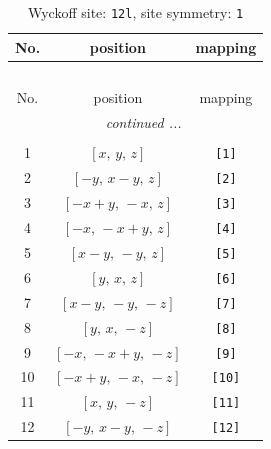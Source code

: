 \documentclass[fleqn,8pt]{jsarticle}
\begin{document}
\begin{longtable}{ccc}
\caption{Wyckoff site: {\tt 12l}, site symmetry: {\tt 1}}
 \\
 \hline \hline
No. & position & mapping \\ \hline \endfirsthead

\multicolumn{2}{l}{\tablename\ \thetable{}} \\
 \hline \hline
No. & position & mapping \\ \hline \endhead

 \hline \hline
\multicolumn{2}{r}{\footnotesize\it continued ...} \\ \endfoot

 \hline \hline
\multicolumn{2}{r}{} \\ \endlastfoot

1 & $\left[ x,\, y,\, z \right]$ & {\tt [1]} \\ \hline
2 & $\left[ - y,\, x - y,\, z \right]$ & {\tt [2]} \\ \hline
3 & $\left[ - x + y,\, - x,\, z \right]$ & {\tt [3]} \\ \hline
4 & $\left[ - x,\, - x + y,\, z \right]$ & {\tt [4]} \\ \hline
5 & $\left[ x - y,\, - y,\, z \right]$ & {\tt [5]} \\ \hline
6 & $\left[ y,\, x,\, z \right]$ & {\tt [6]} \\ \hline
7 & $\left[ x - y,\, - y,\, - z \right]$ & {\tt [7]} \\ \hline
8 & $\left[ y,\, x,\, - z \right]$ & {\tt [8]} \\ \hline
9 & $\left[ - x,\, - x + y,\, - z \right]$ & {\tt [9]} \\ \hline
10 & $\left[ - x + y,\, - x,\, - z \right]$ & {\tt [10]} \\ \hline
11 & $\left[ x,\, y,\, - z \right]$ & {\tt [11]} \\ \hline
12 & $\left[ - y,\, x - y,\, - z \right]$ & {\tt [12]} \\
\end{longtable}
\end{document}
